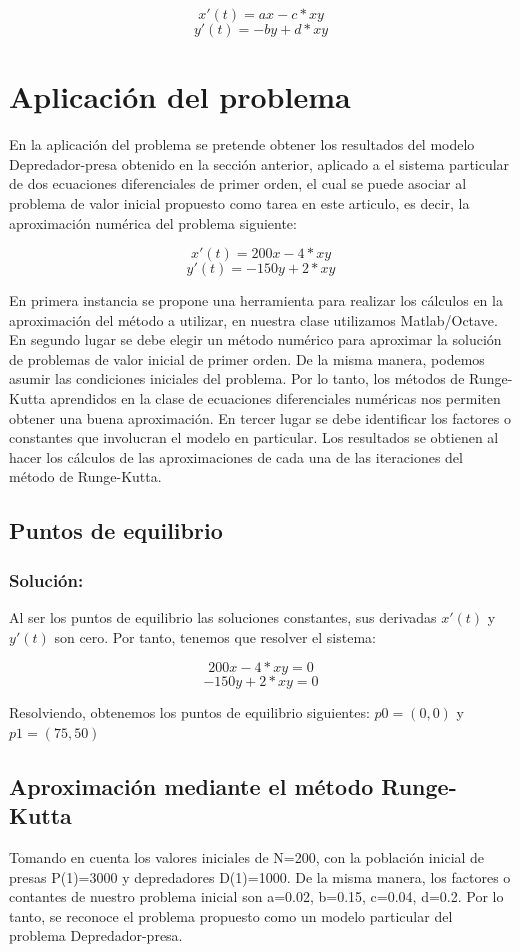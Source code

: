 \documentclass[10pt,letterpaper]{article}
\begin{document}
\[	x'(t)=ax - c*xy\]
\[	y'(t)=-by + d*xy\]

\section{Aplicación del problema}
En la aplicación del problema se pretende obtener los resultados del modelo Depredador-presa obtenido en la sección anterior, aplicado a el sistema particular de dos ecuaciones diferenciales de primer orden, el cual se puede asociar al problema de valor inicial propuesto como tarea  en este articulo, es decir, la aproximación numérica del problema siguiente:

\[	x'(t)=200x-4*xy \]
\[	y'(t)=-150y+2*xy \]  

En primera instancia se propone una herramienta para realizar los cálculos en la aproximación del método a utilizar, en nuestra clase utilizamos Matlab/Octave. En segundo lugar se debe elegir un método numérico para aproximar la solución de problemas de valor inicial de primer orden. De la misma manera, podemos asumir las condiciones iniciales del problema. Por lo tanto, los métodos de Runge-Kutta aprendidos en la clase de ecuaciones diferenciales numéricas nos permiten obtener una buena aproximación. En tercer lugar se debe identificar los factores o constantes que involucran el modelo en particular. Los resultados se obtienen al hacer los cálculos de las aproximaciones de cada una de las iteraciones del método de Runge-Kutta.
   
\subsection{Puntos de equilibrio}   
\subsubsection{Solución:}
Al ser los puntos de equilibrio las soluciones constantes, sus derivadas $x'(t)$ y $y'(t)$ son cero. Por tanto, tenemos que resolver el sistema:

\[	200x-4*xy = 0 \]
\[	-150y+2*xy = 0 \]

Resolviendo, obtenemos los puntos de equilibrio siguientes:
$p0 = (0,0)$ y $p1 = (75,50)$
  
\subsection{Aproximación mediante el método Runge-Kutta}

Tomando en cuenta los valores iniciales de N=200, con la población inicial de presas P(1)=3000 y depredadores D(1)=1000. De la misma manera, los factores o contantes de nuestro problema inicial son a=0.02, b=0.15, c=0.04, d=0.2. Por lo tanto, se reconoce el problema propuesto como un modelo particular del problema Depredador-presa.\\
\end{document}
